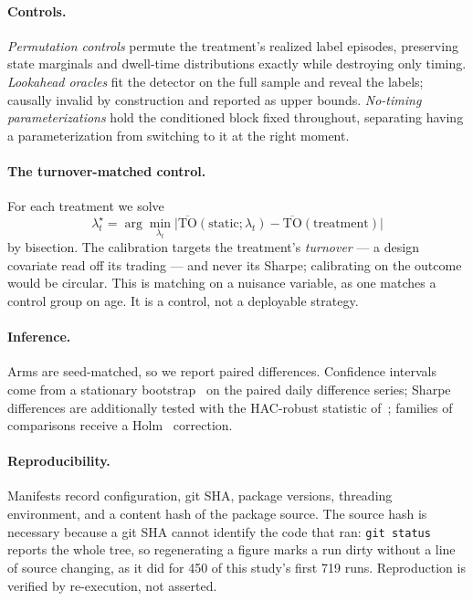 \documentclass[sigconf,anonymous,review]{acmart}
\begin{document}
\paragraph{Controls.} \emph{Permutation controls} permute the treatment's realized
label episodes, preserving state marginals and dwell-time distributions exactly
while destroying only timing. \emph{Lookahead oracles} fit the detector on the full
sample and reveal the labels; causally invalid by construction and reported as
upper bounds. \emph{No-timing parameterizations} hold the conditioned block fixed
throughout, separating having a parameterization from switching to it at the right
moment.

\paragraph{The turnover-matched control.} For each treatment we solve
\begin{equation}
\lambda_t^\star = \arg\min_{\lambda_t}
\bigl| \overline{\mathrm{TO}}(\text{static}; \lambda_t)
- \overline{\mathrm{TO}}(\text{treatment}) \bigr|
\end{equation}
by bisection. The calibration targets the treatment's \emph{turnover} --- a design
covariate read off its trading --- and never its Sharpe; calibrating on the outcome
would be circular. This is matching on a nuisance variable, as one matches a
control group on age. It is a control, not a deployable strategy.

\paragraph{Inference.} Arms are seed-matched, so we report paired differences.
Confidence intervals come from a stationary bootstrap~\cite{PolitisRomano1994} on
the paired daily difference series; Sharpe differences are additionally tested with
the HAC-robust statistic of~\citet{LedoitWolf2008}; families of comparisons receive
a Holm~\cite{Holm1979} correction.

\paragraph{Reproducibility.} Manifests record configuration, git SHA, package
versions, threading environment, and a content hash of the package source. The
source hash is necessary because a git SHA cannot identify the code that ran:
\texttt{git status} reports the whole tree, so regenerating a figure marks a run
dirty without a line of source changing, as it did for 450 of this study's first
719 runs. Reproduction is verified by re-execution, not asserted.
\end{document}
